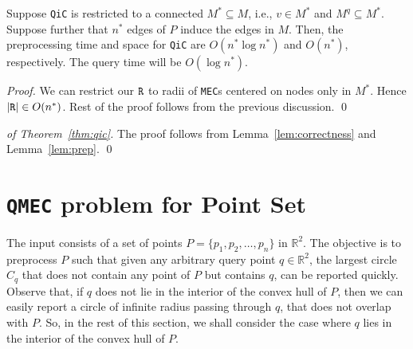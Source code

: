 \documentclass[12pt]{llncs}
\begin{document}
\begin{corollary} \label{cor:mstar}
Suppose {\tt QiC} is restricted to a connected $M^* \subseteq M$, i.e., $v \in M^*$ 
and $M^q \subseteq M^*$. Suppose further that $n^*$ edges of $P$ induce the edges 
in $M$. Then, the preprocessing time and space for {\tt QiC} are $O(n^* \log n^*)$ and 
$O(n^*)$, respectively. The query time will be $O(\log n^*)$.
\end{corollary}
\begin{proof}
We can restrict our ${\tt R}$ to radii of {\tt MEC}s centered on nodes only in $M^*$. 
Hence $|{\tt R}| \in O(n^*)$. 
Rest of the proof follows from the previous discussion.
\qed
\end{proof}

\begin{proof}[of Theorem\ \ref{thm:qic}]
The proof follows from Lemma\ \ref{lem:correctness} and Lemma\ \ref{lem:prep}.
\qed
\end{proof}

\section{{\tt QMEC} problem for Point Set}
\label{sec:QMEC}
The input consists of a set of points $P=\{p_1, p_2, \ldots, p_n\}$ in 
$\mathbb{R}^2$. The objective is to preprocess $P$ such that given any 
arbitrary query point $q \in \mathbb{R}^2$, the largest circle $C_q$ that
does not contain any point of $P$ but contains $q$, can be reported 
quickly. Observe that, if $q$ does not lie in the interior of the convex 
hull of $P$, then we can easily report a circle of infinite radius passing 
through $q$, that does not overlap with $P$. So, in the rest of this section, 
we shall consider the case where $q$ lies in the  interior of the convex 
hull of $P$. 
\end{document}
